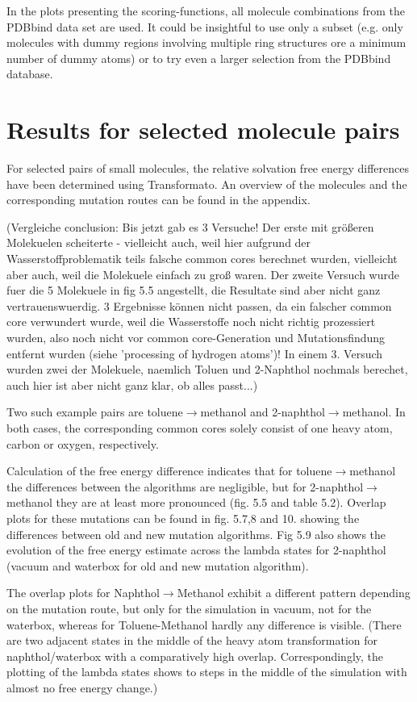 In the plots presenting the scoring-functions, all molecule combinations
from the PDBbind data set are used. It could be insightful to use
only a subset (e.g. only molecules with dummy regions involving multiple
ring structures ore a minimum number of dummy atoms) or to try even a larger selection from the PDBbind database.

\section{Results for selected molecule pairs}

For selected pairs of small molecules, the relative solvation free energy differences have been determined using Transformato. 
An overview of the molecules and the corresponding mutation routes can be found in the appendix.

 {\color{red} (Vergleiche conclusion: Bis jetzt gab es 3 Versuche! Der erste mit größeren Molekuelen scheiterte - vielleicht auch, weil hier aufgrund der Wasserstoffproblematik teils falsche common cores berechnet wurden, vielleicht aber auch, weil die Molekuele einfach zu groß waren. Der zweite Versuch wurde fuer die 5 Molekuele in fig 5.5 angestellt, die Resultate sind aber nicht ganz vertrauenswuerdig. 3 Ergebnisse können nicht passen, da ein falscher common core verwundert wurde, weil die Wasserstoffe noch nicht richtig prozessiert wurden, also noch nicht vor common core-Generation und Mutationsfindung entfernt wurden (siehe 'processing of hydrogen atoms')! In einem 3. Versuch wurden zwei der Molekuele, naemlich Toluen und 2-Naphthol nochmals berechet, auch hier ist aber nicht ganz klar, ob alles passt...)}
 
Two such example pairs are toluene$\rightarrow$methanol and 2-naphthol$\rightarrow$methanol. In both cases, the corresponding common cores solely consist of one heavy atom, carbon or oxygen, respectively.

Calculation of the free energy difference indicates that for toluene$ 	\rightarrow $methanol the differences between the algorithms are negligible, but for 2-naphthol$ 	\rightarrow $methanol they are at least more pronounced (fig. 5.5 and table 5.2). 
Overlap plots for these mutations can be found in fig. 5.7,8 and 10. showing the differences between old and new mutation algorithms. Fig 5.9 also shows the evolution of the free energy estimate across the lambda states for 2-naphthol (vacuum and waterbox for old and new mutation algorithm).

The overlap plots for Naphthol$\rightarrow$Methanol exhibit a different pattern depending on the mutation route, but only for the simulation in vacuum, not for the waterbox, whereas for Toluene-Methanol hardly any difference is visible. (There are two adjacent states in the middle of the heavy atom transformation for naphthol/waterbox with a comparatively high overlap. Correspondingly, the plotting of the lambda states shows to steps in the middle of the simulation with almost no free energy change.)

